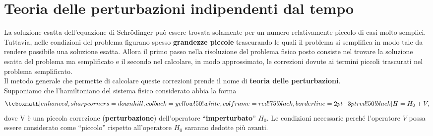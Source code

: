 \documentclass[a4paper,12pt,oneside]{book}
\newcommand*{\myfont}{\fontfamily{ppl}\selectfont}
\begin{document}
\fancypagestyle{plain}{%
\fancyhf{} %
\fancyfoot[C]{\bfseries \myfont{\thepage}} %
\renewcommand{\headrulewidth}{0pt}
\renewcommand{\footrulewidth}{0pt}}

\fancypagestyle{VS}{
\headheight = 15pt
\lhead[\myfont{\textit{\textbf{\thechapter\nouppercase{\leftmark}}}}]{\myfont{\textit{\textbf{\nouppercase{\leftmark}}}}}
\chead[]{}
\rhead[\myfont{\textbf{\thepage}}]{\myfont{\textbf{\thepage}}}

\lfoot[]{}
\cfoot[]{}
\rfoot[]{}
}



\pagestyle{VS}
\setcounter{chapter}{13}
\setcounter{page}{147}
\chapter[T.d.P. indipendenti dal tempo]{Teoria delle perturbazioni indipendenti dal tempo}
La soluzione esatta dell'equazione di Schr\"{o}dinger può essere trovata solamente per un numero relativamente piccolo di casi molto semplici.\\

Tuttavia, nelle condizioni del problema figurano spesso \textbf{grandezze piccole} trascurando le quali il problema si semplifica in modo tale da rendere possibile una soluzione esatta. Allora il primo passo nella risoluzione del problema fisico posto consiste nel trovare la soluzione esatta del problema ma semplificato e il secondo nel calcolare, in modo approssimato, le correzioni dovute ai termini piccoli trascurati nel problema semplificato.\\

Il metodo generale che permette di calcolare queste correzioni prende il nome di \textbf{teoria delle perturbazioni}.\\

Supponiamo che l'hamiltoniano del sistema fisico considerato abbia la forma
	\begin{equation}
		\tcboxmath[enhanced, sharp corners=downhill, colback=yellow!50!white, colframe=red!75!black, borderline={2pt}{-3pt}{red!50!black}]{
			H= H_0+ V,
			}
	\end{equation}
dove V è una piccola correzione (\textbf{perturbazione}) dell'operatore ``\textbf{imperturbato}'' $H_0$. Le condizioni necessarie perché l'operatore $V$ possa essere considerato come ``piccolo'' rispetto all'operatore $H_0$ saranno dedotte più avanti.\\
\end{document}
